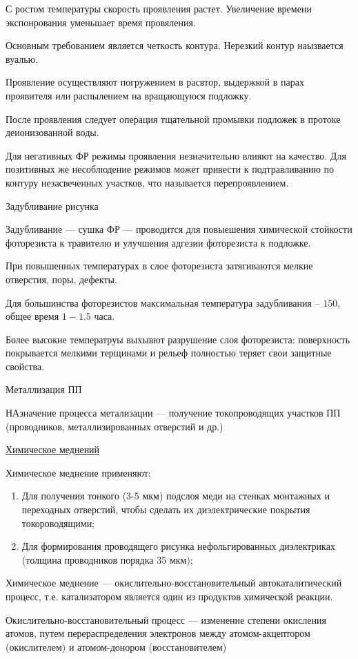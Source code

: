 \documentclass{article}
\begin{document}
С ростом температуры скорость проявления растет. Увеличение времени экспонрования уменьшает время провяления.

Основным требованием является четкость контура. Нерезкий контур наызвается вуалью.

Проявление осуществляют погружением в расвтор, выдержкой в парах проявителя или распылением на вращающуюся подложку.

После проявления следует операция тщательной промывки подложек в протоке деионизованной воды.

Для негативных ФР режимы проявления незначительно влияют на качество. Для позитивных же несоблюдение режимов может привести к подтравливанию по контуру незасвеченных участков, что называется перепроявлением.

Задубливание рисунка

Задубливание --- сушка ФР --- проводится для повыешения химической стойкости фоторезиста к травителю и улучшения адгезии фоторезиста к подложке.

При повышенных температурах в слое фоторезиста затягиваются мелкие отверстия, поры, дефекты.

Для большинства фоторезистов максимальная температура задубливания -- $150$, общее время $1-1.5$ часа.

Более высокие температруы выхывют разрушение слоя фоторезиста: поверхность покрывается мелкими терщинами и рельеф полностью теряет свои защитные свойства.

Металлизация ПП

НАзначение процесса метализации --- получение токопроводящих участков ПП (проводников, металлизированных отверстий и др.)

\underline{Химическое меднений} 

Химическое меднение применяют:
\begin{enumerate}
	\item Для получения тонкого (3-5 мкм) подслоя меди на стенках монтажных и переходных отверстий, чтобы сделать их диэлектрические покрытия токороводящими;
	\item Для формирования проводящего рисунка нефольгированных диэлектриках (толщина проводников порядка 35 мкм);
\end{enumerate}

Химическое меднение --- окислительно-восстановительный автокаталитический процесс, т.е. катализатором является один из продуктов химической реакции.

Окислительно-восстановительный процесс --- изменение степени окисления атомов, путем перераспределения электронов между атомом-акцептором (окислителем) и атомом-донором (восстановителем)
\end{document}

